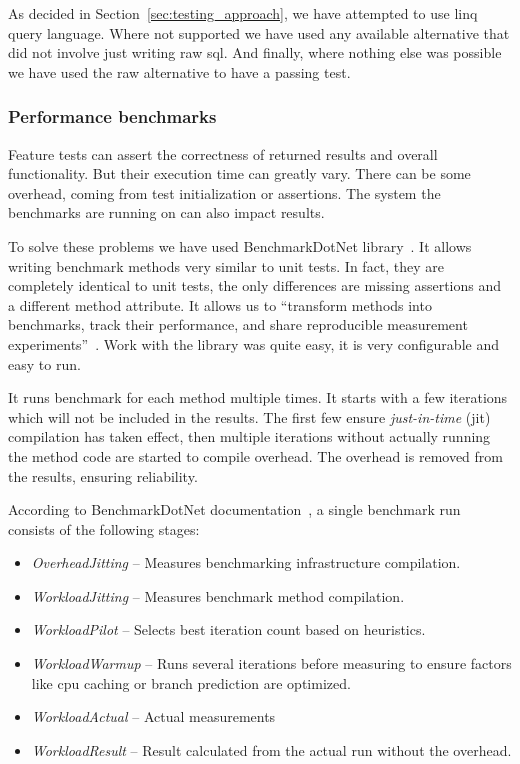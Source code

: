 As decided in Section~\ref{sec:testing_approach}, we have attempted to use \acrshort{linq} query language. Where not supported we have used any available alternative that did not involve just writing raw \acrshort{sql}. And finally, where nothing else was possible we have used the raw alternative to have a passing test.  

\subsubsection{Performance benchmarks}
Feature tests can assert the correctness of returned results and overall functionality. But their execution time can greatly vary. There can be some overhead, coming from test initialization or assertions. The system the benchmarks are running on can also impact results.

To solve these problems we have used BenchmarkDotNet library~\cite{BenchmarkDotNet}. It allows writing benchmark methods very similar to unit tests. In fact, they are completely identical to unit tests, the only differences are missing assertions and a different method attribute. It allows us to ``transform methods into benchmarks, track their performance, and share reproducible measurement experiments''~\cite{BenchmarkDotNet}. Work with the library was quite easy, it is very configurable and easy to run. 

It runs benchmark for each method multiple times. It starts with a few iterations which will not be included in the results. The first few ensure \textit{just-in-time} (\acrshort{jit}) compilation has taken effect, then multiple iterations without actually running the method code are started to compile overhead. The overhead is removed from the results, ensuring reliability. 

According to BenchmarkDotNet documentation~\cite{BenchmarkDotNetHow}, a single benchmark run consists of the following stages:
\begin{itemize}
    \item \textit{OverheadJitting} -- Measures benchmarking infrastructure compilation.
    \item \textit{WorkloadJitting} -- Measures benchmark method compilation.
    \item \textit{WorkloadPilot} -- Selects best iteration count based on heuristics.
    \item \textit{WorkloadWarmup} -- Runs several iterations before measuring to ensure factors like \acrshort{cpu} caching or branch prediction are optimized.
    \item \textit{WorkloadActual} -- Actual measurements
    \item \textit{WorkloadResult} -- Result calculated from the actual run without the overhead.
\end{itemize}

